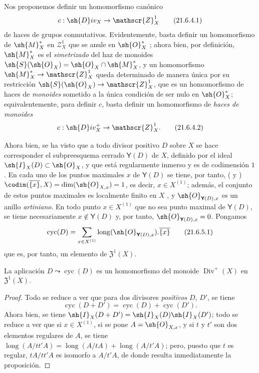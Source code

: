 \begin{env}[21.6.4]
\label{IV.21.6.4}
Nos proponemos definir un homomorfismo canónico
\[
\label{IV.21.6.4.1}
  c:\sh{D}iv_X\to\mathscr{Z}_X^1
  \tag{21.6.4.1}
\]
de haces de grupos conmutativos.
Evidentemente, basta definir un homomorfismo de $\sh{M}_X^*$ en $\mathscr{Z}_X^1$ que se anule en $\sh{O}_X^*$ ;
ahora bien, por definición, $\sh{M}_X^*$ es el \emph{simetrizado} del haz de monoides $\sh{S}(\sh{O}_X)=\sh{O}_X\cap\sh{M}_X^*$, y un homomorfismo $\sh{M}_X^*\to\mathscr{Z}_X^1$ queda determinado de manera única por su restricción $\sh{S}(\sh{O}_X)\to\mathscr{Z}_X^1$, que es un homomorfismo de haces de \emph{monoides} sometido a la única condición de ser nulo en $\sh{O}_X^*$;
equivalentemente, para definir $c$, basta definir un homomorfismo de \emph{haces de monoides}
\[
\label{IV.21.6.4.2}
  c:\sh{D}iv_X^+\to\mathscr{Z}_X^1.
  \tag{21.6.4.2}
\]
\end{env}

\begin{env}[21.6.5]
\label{IV.21.6.5}
Ahora bien, se ha visto que a todo divisor positivo $D$ sobre $X$ se hace corresponder el subpreesquema cerrado $\boldsymbol{\mathsf{Y}}(D)$ de $X$, definido por el ideal $\sh{I}_X(D)\subset\sh{O}_X$, y que está regularmente inmerso y es de codimensión $1$.
En cada uno de los puntos maximales $x$ de $\boldsymbol{\mathsf{Y}}(D)$ se tiene, por tanto, ( y ) $\codim(\overline{\{x\}},X)=\dim(\sh{O}_{X,x})=1$, es decir, $x\in X^{(1)}$;
además, el conjunto de estos puntos maximales es localmente finito en $X$ , y $\sh{O}_{\boldsymbol{\mathsf{Y}}(D),x}$ es un anillo \emph{artiniano}.
En todo punto $x\in X^{(1)}$ que no sea punto maximal de $\boldsymbol{\mathsf{Y}}(D)$, se tiene necesariamente $x\notin\boldsymbol{\mathsf{Y}}(D)$ y, por tanto, $\sh{O}_{\boldsymbol{\mathsf{Y}}(D),x}=0$.
Pongamos
\[
\label{IV.21.6.5.1}
  \operatorname{cyc}(D)=\sum_{x\in X^{(1)}}\operatorname{long}(\sh{O}_{\boldsymbol{\mathsf{Y}}(D),x}).\overline{\{x\}}
  \tag{21.6.5.1}
\]
que es, por tanto, un elemento de $\mathfrak{Z}^1(X)$.
\end{env}

\begin{proposition}[21.6.6]
\label{IV.21.6.6}
La aplicación $D\leadsto\operatorname{cyc}(D)$ es un homomorfismo del monoide $\operatorname{Div}^+(X)$ en $\mathfrak{Z}^1(X)$.
\end{proposition}

\begin{proof}
Todo se reduce a ver que para dos divisores \emph{positivos} $D$, $D'$, se tiene
\[
  \operatorname{cyc}(D+D')=\operatorname{cyc}(D)+\operatorname{cyc}(D').
\]
Ahora bien, se tiene  $\sh{I}_X(D+D')=\sh{I}_X(D)\sh{I}_X(D')$;
todo se reduce a ver que si $x\in X^{(1)}$, si se pone $A=\sh{O}_{X,x}$, y si $t$ y $t'$ son dos elementos regulares de $A$, se tiene $\operatorname{long}(A/tt'A)=\operatorname{long}(A/tA)+\operatorname{long}(A/t'A)$;
pero, puesto que $t$ es regular, $tA/tt'A$ es isomorfo a $A/t'A$, de donde resulta inmediatamente la proposición.
\end{proof}


